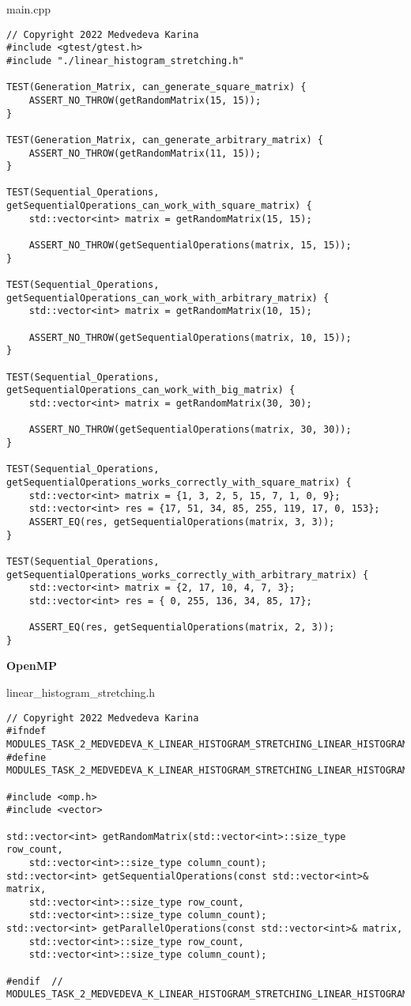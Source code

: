 \documentclass{report}
\begin{document}
\par main.cpp
\begin{lstlisting}
// Copyright 2022 Medvedeva Karina
#include <gtest/gtest.h>
#include "./linear_histogram_stretching.h"

TEST(Generation_Matrix, can_generate_square_matrix) {
    ASSERT_NO_THROW(getRandomMatrix(15, 15));
}

TEST(Generation_Matrix, can_generate_arbitrary_matrix) {
    ASSERT_NO_THROW(getRandomMatrix(11, 15));
}

TEST(Sequential_Operations, getSequentialOperations_can_work_with_square_matrix) {
    std::vector<int> matrix = getRandomMatrix(15, 15);

    ASSERT_NO_THROW(getSequentialOperations(matrix, 15, 15));
}

TEST(Sequential_Operations, getSequentialOperations_can_work_with_arbitrary_matrix) {
    std::vector<int> matrix = getRandomMatrix(10, 15);

    ASSERT_NO_THROW(getSequentialOperations(matrix, 10, 15));
}

TEST(Sequential_Operations, getSequentialOperations_can_work_with_big_matrix) {
    std::vector<int> matrix = getRandomMatrix(30, 30);

    ASSERT_NO_THROW(getSequentialOperations(matrix, 30, 30));
}

TEST(Sequential_Operations, getSequentialOperations_works_correctly_with_square_matrix) {
    std::vector<int> matrix = {1, 3, 2, 5, 15, 7, 1, 0, 9};
    std::vector<int> res = {17, 51, 34, 85, 255, 119, 17, 0, 153};
    ASSERT_EQ(res, getSequentialOperations(matrix, 3, 3));
}

TEST(Sequential_Operations, getSequentialOperations_works_correctly_with_arbitrary_matrix) {
    std::vector<int> matrix = {2, 17, 10, 4, 7, 3};
    std::vector<int> res = { 0, 255, 136, 34, 85, 17};

    ASSERT_EQ(res, getSequentialOperations(matrix, 2, 3));
}
\end{lstlisting}

\textbf{OpenMP}
\par linear\_histogram\_stretching.h
\begin{lstlisting}
// Copyright 2022 Medvedeva Karina
#ifndef MODULES_TASK_2_MEDVEDEVA_K_LINEAR_HISTOGRAM_STRETCHING_LINEAR_HISTOGRAM_STRETCHING_H_
#define MODULES_TASK_2_MEDVEDEVA_K_LINEAR_HISTOGRAM_STRETCHING_LINEAR_HISTOGRAM_STRETCHING_H_

#include <omp.h>
#include <vector>

std::vector<int> getRandomMatrix(std::vector<int>::size_type row_count,
    std::vector<int>::size_type column_count);
std::vector<int> getSequentialOperations(const std::vector<int>& matrix,
    std::vector<int>::size_type row_count,
    std::vector<int>::size_type column_count);
std::vector<int> getParallelOperations(const std::vector<int>& matrix,
    std::vector<int>::size_type row_count,
    std::vector<int>::size_type column_count);

#endif  // MODULES_TASK_2_MEDVEDEVA_K_LINEAR_HISTOGRAM_STRETCHING_LINEAR_HISTOGRAM_STRETCHING_H_
\end{lstlisting}
\end{document}
